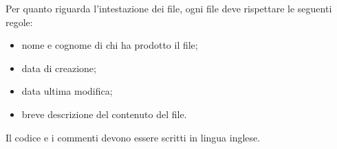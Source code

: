 Per quanto riguarda l'intestazione dei file, ogni file deve rispettare le seguenti regole: 
\begin{itemize}
	\item nome e cognome di chi ha prodotto il file;
	\item data di creazione;
	\item data ultima modifica;
	\item breve descrizione del contenuto del file.
\end{itemize} 

Il codice e i commenti devono essere scritti in lingua inglese.

